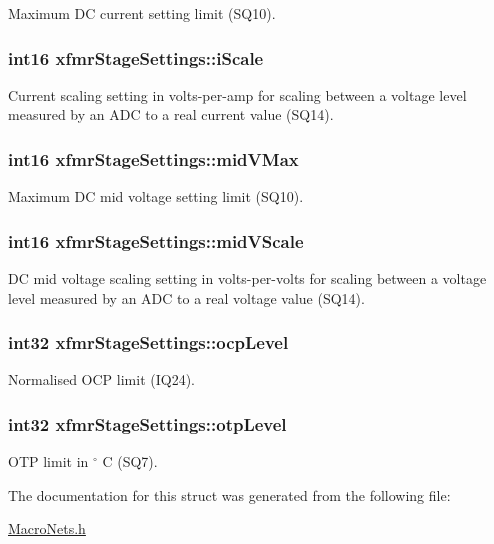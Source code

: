 Maximum D\-C current setting limit (S\-Q10). \hypertarget{a00010_a3b4f123000ae32ca041c6286e5c92fd4}{
\subsubsection[{i\-Scale}]{\setlength{\rightskip}{0pt plus 5cm}int16 xfmr\-Stage\-Settings\-::i\-Scale}}\label{a00010_a3b4f123000ae32ca041c6286e5c92fd4}
Current scaling setting in volts-\/per-\/amp for scaling between a voltage level measured by an A\-D\-C to a real current value (S\-Q14). \hypertarget{a00010_a251fa7af71c610bf2b193afde33e1338}{
\subsubsection[{mid\-V\-Max}]{\setlength{\rightskip}{0pt plus 5cm}int16 xfmr\-Stage\-Settings\-::mid\-V\-Max}}\label{a00010_a251fa7af71c610bf2b193afde33e1338}
Maximum D\-C mid voltage setting limit (S\-Q10). \hypertarget{a00010_a44cb584d774e345422c57cc155b65d0c}{
\subsubsection[{mid\-V\-Scale}]{\setlength{\rightskip}{0pt plus 5cm}int16 xfmr\-Stage\-Settings\-::mid\-V\-Scale}}\label{a00010_a44cb584d774e345422c57cc155b65d0c}
D\-C mid voltage scaling setting in volts-\/per-\/volts for scaling between a voltage level measured by an A\-D\-C to a real voltage value (S\-Q14). \hypertarget{a00010_a99d85a680a0b0b7f1858d77a3ac216b3}{
\subsubsection[{ocp\-Level}]{\setlength{\rightskip}{0pt plus 5cm}int32 xfmr\-Stage\-Settings\-::ocp\-Level}}\label{a00010_a99d85a680a0b0b7f1858d77a3ac216b3}
Normalised O\-C\-P limit (I\-Q24). \hypertarget{a00010_a582f0218997b0b37f365b75ae274e67c}{
\subsubsection[{otp\-Level}]{\setlength{\rightskip}{0pt plus 5cm}int32 xfmr\-Stage\-Settings\-::otp\-Level}}\label{a00010_a582f0218997b0b37f365b75ae274e67c}
O\-T\-P limit in $ ^\circ$ C (S\-Q7). 

The documentation for this struct was generated from the following file\-:\begin{DoxyCompactItemize}
\item 
\hyperlink{a00027}{Macro\-Nets.\-h}\end{DoxyCompactItemize}
